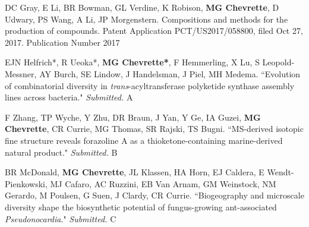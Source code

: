 
\begin{cvpubs}

\cvpub
{DC Gray, E Li, BR Bowman, GL Verdine, K Robison, \textbf{MG Chevrette}, D Udwary, PS Wang, A Li, JP Morgenstern. Compositions and methods for the production of compounds. Patent Application PCT/US2017/058800, filed Oct 27, 2017. Publication Number  \textbf{\textit{}}}
{2017}

\end{cvpubs}


\begin{cvpubs}

\cvpub
{EJN Helfrich*, R Ueoka*, \textbf{MG Chevrette*}, F Hemmerling, X Lu, S Leopold-Messner, AY Burch, SE Lindow, J Handelsman, J Piel, MH Medema. ``Evolution of combinatorial diversity in \textit{trans}-acyltransferase polyketide synthase assembly lines across bacteria." \textit{Submitted.}}
{A}

\cvpub
{F Zhang, TP Wyche, Y Zhu, DR Braun, J Yan, Y Ge, IA Guzei, \textbf{MG Chevrette}, CR Currie, MG Thomas, SR Rajski, TS Bugni. ``MS-derived isotopic fine structure reveals forazoline A as a thioketone-containing marine-derived natural product." \textit{Submitted.}}
{B}

\cvpub
{BR McDonald, \textbf{MG Chevrette}, JL Klassen, HA Horn, EJ Caldera, E Wendt-Pienkowski, MJ Cafaro, AC Ruzzini, EB Van Arnam, GM Weinstock, NM Gerardo, M Poulsen, G Suen, J Clardy, CR Currie. ``Biogeography and microscale diversity shape the biosynthetic potential of fungus-growing ant-associated \textit{Pseudonocardia}." \textit{Submitted. \textbf{}}}
{C}

\end{cvpubs}


